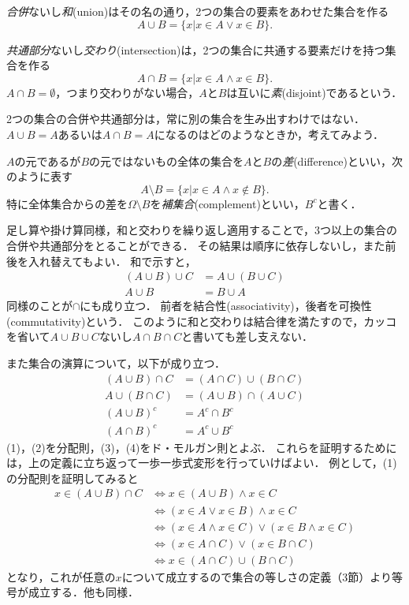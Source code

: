 \documentclass[11pt,a4paper]{jsarticle}
\begin{document}
\emph{合併}ないし\emph{和}(union)はその名の通り，2つの集合の要素をあわせた集合を作る
\[
 A \cup B = \{ x | x \in A \vee x \in B\} .
\]


\emph{共通部分}ないし\emph{交わり}(intersection)は，2つの集合に共通する要素だけを持つ集合を作る
\[
 A \cap B = \{ x | x \in A \wedge x \in B\}.
\]
$A \cap B = \emptyset$，つまり交わりがない場合，$A$と$B$は互いに\emph{素}(disjoint)であるという．

\begin{attn}
 2つの集合の合併や共通部分は，常に別の集合を生み出すわけではない．$A \cup B = A$あるいは$A \cap B = A$になるのはどのようなときか，考えてみよう．
\end{attn}


$A$の元であるが$B$の元ではないもの全体の集合を$A$と$B$の\emph{差}(difference)といい，次のように表す
\[
 A \setminus B = \{ x | x \in A \wedge x \not\in B\}.
\]
特に全体集合からの差を$\Omega \setminus B$を\emph{補集合}(complement)といい，$B^c$と書く．

足し算や掛け算同様，和と交わりを繰り返し適用することで，3つ以上の集合の合併や共通部分をとることができる．
その結果は順序に依存しないし，また前後を入れ替えてもよい．
和で示すと，
\begin{align*}
 (A \cup B) \cup C & = A \cup (B \cup C) \\
 A \cup B & = B \cup A
\end{align*}
同様のことが$\cap$にも成り立つ．
前者を結合性(associativity)，後者を可換性(commutativity)という．
このように和と交わりは結合律を満たすので，カッコを省いて$A \cup B \cup C$ないし$A \cap B \cap C$と書いても差し支えない．

また集合の演算について，以下が成り立つ．
\begin{align}
(A \cup B) \cap C &= (A \cap C) \cup (B \cap C) \\
A \cup (B \cap C) &= (A \cup B) \cap (A \cup C) \\
(A \cup B)^c &= A^c \cap B^c \\
(A \cap B)^c &= A^c \cup B^c
\end{align}
(1)，(2)を分配則，(3)，(4)をド・モルガン則とよぶ．
これらを証明するためには，上の定義に立ち返って一歩一歩式変形を行っていけばよい．
例として，(1)の分配則を証明してみると
\begin{align*}
x \in (A \cup B) \cap C &\iff x \in (A \cup B) \wedge x \in C \\
&\iff  (x \in A \vee x \in B) \wedge x \in C \\
&\iff  (x \in A \wedge x \in C) \vee (x \in B \wedge x \in C) \\
&\iff  (x \in A \cap C) \vee (x \in B \cap C) \\
&\iff  x \in (A \cap C) \cup (B \cap C) 
\end{align*}
となり，これが任意の$x$について成立するので集合の等しさの定義（3節）より等号が成立する．他も同様．
\end{document}
